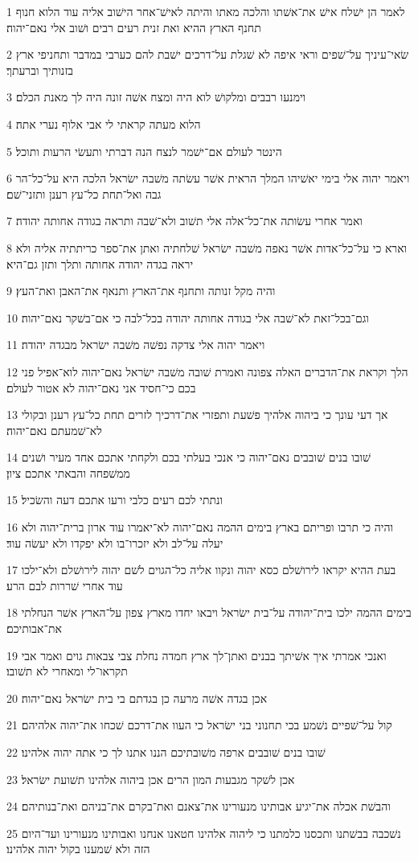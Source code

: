 \par 1 לאמר הן ישׁלח אישׁ את־אשׁתו והלכה מאתו והיתה לאישׁ־אחר הישׁוב אליה עוד הלוא חנוף תחנף הארץ ההיא ואת זנית רעים רבים ושׁוב אלי נאם־יהוה׃
\par 2 שׂאי־עיניך על־שׁפים וראי איפה לא שׁגלת על־דרכים ישׁבת להם כערבי במדבר ותחניפי ארץ בזנותיך וברעתך׃
\par 3 וימנעו רבבים ומלקושׁ לוא היה ומצח אשׁה זונה היה לך מאנת הכלם׃
\par 4 הלוא מעתה קראתי לי אבי אלוף נערי אתה׃
\par 5 הינטר לעולם אם־ישׁמר לנצח הנה דברתי ותעשׂי הרעות ותוכל׃
\par 6 ויאמר יהוה אלי בימי יאשׁיהו המלך הראית אשׁר עשׂתה משׁבה ישׂראל הלכה היא על־כל־הר גבה ואל־תחת כל־עץ רענן ותזני־שׁם׃
\par 7 ואמר אחרי עשׂותה את־כל־אלה אלי תשׁוב ולא־שׁבה ותראה בגודה אחותה יהודה׃
\par 8 וארא כי על־כל־אדות אשׁר נאפה משׁבה ישׂראל שׁלחתיה ואתן את־ספר כריתתיה אליה ולא יראה בגדה יהודה אחותה ותלך ותזן גם־היא׃
\par 9 והיה מקל זנותה ותחנף את־הארץ ותנאף את־האבן ואת־העץ׃
\par 10 וגם־בכל־זאת לא־שׁבה אלי בגודה אחותה יהודה בכל־לבה כי אם־בשׁקר נאם־יהוה׃
\par 11 ויאמר יהוה אלי צדקה נפשׁה משׁבה ישׂראל מבגדה יהודה׃
\par 12 הלך וקראת את־הדברים האלה צפונה ואמרת שׁובה משׁבה ישׂראל נאם־יהוה לוא־אפיל פני בכם כי־חסיד אני נאם־יהוה לא אטור לעולם׃
\par 13 אך דעי עונך כי ביהוה אלהיך פשׁעת ותפזרי את־דרכיך לזרים תחת כל־עץ רענן ובקולי לא־שׁמעתם נאם־יהוה׃
\par 14 שׁובו בנים שׁובבים נאם־יהוה כי אנכי בעלתי בכם ולקחתי אתכם אחד מעיר ושׁנים ממשׁפחה והבאתי אתכם ציון׃
\par 15 ונתתי לכם רעים כלבי ורעו אתכם דעה והשׂכיל׃
\par 16 והיה כי תרבו ופריתם בארץ בימים ההמה נאם־יהוה לא־יאמרו עוד ארון ברית־יהוה ולא יעלה על־לב ולא יזכרו־בו ולא יפקדו ולא יעשׂה עוד׃
\par 17 בעת ההיא יקראו לירושׁלם כסא יהוה ונקוו אליה כל־הגוים לשׁם יהוה לירושׁלם ולא־ילכו עוד אחרי שׁררות לבם הרע׃
\par 18 בימים ההמה ילכו בית־יהודה על־בית ישׂראל ויבאו יחדו מארץ צפון על־הארץ אשׁר הנחלתי את־אבותיכם׃
\par 19 ואנכי אמרתי איך אשׁיתך בבנים ואתן־לך ארץ חמדה נחלת צבי צבאות גוים ואמר אבי תקראו־לי ומאחרי לא תשׁובו׃
\par 20 אכן בגדה אשׁה מרעה כן בגדתם בי בית ישׂראל נאם־יהוה׃
\par 21 קול על־שׁפיים נשׁמע בכי תחנוני בני ישׂראל כי העוו את־דרכם שׁכחו את־יהוה אלהיהם׃
\par 22 שׁובו בנים שׁובבים ארפה משׁובתיכם הננו אתנו לך כי אתה יהוה אלהינו׃
\par 23 אכן לשׁקר מגבעות המון הרים אכן ביהוה אלהינו תשׁועת ישׂראל׃
\par 24 והבשׁת אכלה את־יגיע אבותינו מנעורינו את־צאנם ואת־בקרם את־בניהם ואת־בנותיהם׃
\par 25 נשׁכבה בבשׁתנו ותכסנו כלמתנו כי ליהוה אלהינו חטאנו אנחנו ואבותינו מנעורינו ועד־היום הזה ולא שׁמענו בקול יהוה אלהינו׃

